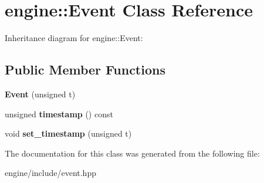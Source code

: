 \hypertarget{classengine_1_1_event}{}\section{engine\+:\+:Event Class Reference}
\label{classengine_1_1_event}


Inheritance diagram for engine\+:\+:Event\+:
\subsection*{Public Member Functions}
\begin{DoxyCompactItemize}
\item 
{\bfseries Event} (unsigned t)\hypertarget{classengine_1_1_event_aad35f04a934e152c3959c7a9674af509}{}\label{classengine_1_1_event_aad35f04a934e152c3959c7a9674af509}

\item 
unsigned {\bfseries timestamp} () const \hypertarget{classengine_1_1_event_aaf22632d10bd7d1f74ccd07cc709eb20}{}\label{classengine_1_1_event_aaf22632d10bd7d1f74ccd07cc709eb20}

\item 
void {\bfseries set\+\_\+timestamp} (unsigned t)\hypertarget{classengine_1_1_event_a6f6433795945a5c3ceb59fe00adb8b88}{}\label{classengine_1_1_event_a6f6433795945a5c3ceb59fe00adb8b88}

\end{DoxyCompactItemize}


The documentation for this class was generated from the following file\+:\begin{DoxyCompactItemize}
\item 
engine/include/event.\+hpp\end{DoxyCompactItemize}
